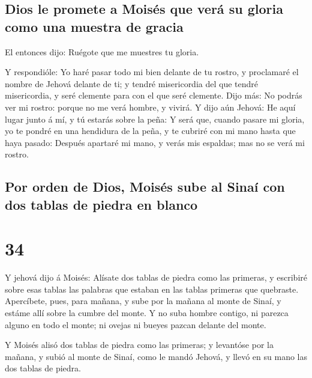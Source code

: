 \hypertarget{dios-le-promete-a-moisuxe9s-que-veruxe1-su-gloria-como-una-muestra-de-gracia}{%
\subsection{Dios le promete a Moisés que verá su gloria como una muestra
de
gracia}\label{dios-le-promete-a-moisuxe9s-que-veruxe1-su-gloria-como-una-muestra-de-gracia}}

 El entonces dijo: Ruégote que me muestres tu gloria.

 Y respondióle: Yo haré pasar todo mi bien delante de tu
rostro, y proclamaré el nombre de Jehová delante de ti; y tendré
misericordia del que tendré misericordia, y seré clemente para con el
que seré clemente.  Dijo más: No podrás ver mi rostro:
porque no me verá hombre, y vivirá.  Y dijo aún Jehová: He
aquí lugar junto á mí, y tú estarás sobre la peña:  Y será
que, cuando pasare mi gloria, yo te pondré en una hendidura de la peña,
y te cubriré con mi mano hasta que haya pasado:  Después
apartaré mi mano, y verás mis espaldas; mas no se verá mi rostro.

\hypertarget{por-orden-de-dios-moisuxe9s-sube-al-sinauxed-con-dos-tablas-de-piedra-en-blanco}{%
\subsection{Por orden de Dios, Moisés sube al Sinaí con dos tablas de
piedra en
blanco}\label{por-orden-de-dios-moisuxe9s-sube-al-sinauxed-con-dos-tablas-de-piedra-en-blanco}}

\hypertarget{section-33}{%
\section{34}\label{section-33}}

 Y jehová dijo á Moisés: Alísate dos tablas de piedra como
las primeras, y escribiré sobre esas tablas las palabras que estaban en
las tablas primeras que quebraste.  Apercíbete, pues, para
mañana, y sube por la mañana al monte de Sinaí, y estáme allí sobre la
cumbre del monte.  Y no suba hombre contigo, ni parezca
alguno en todo el monte; ni ovejas ni bueyes pazcan delante del monte.

 Y Moisés alisó dos tablas de piedra como las primeras; y
levantóse por la mañana, y subió al monte de Sinaí, como le mandó
Jehová, y llevó en su mano las dos tablas de piedra.

